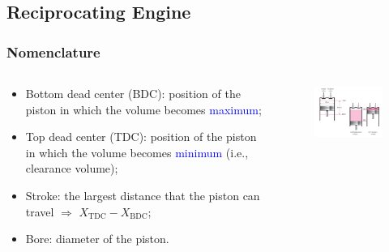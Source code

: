 \documentclass[10pt,compress]{beamer}
\begin{document}
\subsection{Reciprocating Engine}
\begin{frame}
 \frametitle{Nomenclature}
 \begin{columns}
  \begin{column}[c]{0.4\linewidth}
   \begin{itemize}
    \item <1-> Bottom dead center (BDC): position of the piston in which the volume becomes \textcolor{blue}{maximum};
    \item <2-> Top dead center (TDC): position of the piston in which the volume becomes \textcolor{blue}{minimum} (i.e., clearance volume);
    \item <3-> Stroke: the largest distance that the piston can travel $\Longrightarrow$ $X_{\text{TDC}}-X_{\text{BDC}}$;
    \item <4-> Bore: diameter of the piston.
   \end{itemize}
  \end{column}
  \begin{column}[c]{0.6\linewidth}
   \begin{figure}%
    \begin{center}
     \includegraphics[width=7.5cm,clip]{./Pics/GasCycle_ReciprocatingEngine}
    \end{center}
   \end{figure}  
  \end{column}  
 \end{columns}
\end{frame}
\end{document}
